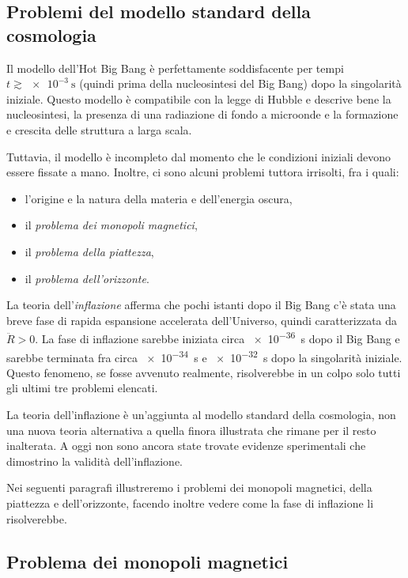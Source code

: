 \subsection{Problemi del modello standard della cosmologia}
\label{sec:problemi-cosmologia}

Il modello dell'Hot Big Bang è perfettamente soddisfacente per tempi \(t\gtrsim
\SI{e-3}{\second}\) (quindi prima della nucleosintesi del Big Bang) dopo la
singolarità iniziale.  Questo modello è compatibile con la legge di Hubble e
descrive bene la nucleosintesi, la presenza di una radiazione di fondo a
microonde e la formazione e crescita delle struttura a larga scala.

Tuttavia, il modello è incompleto dal momento che le condizioni iniziali devono
essere fissate a mano.  Inoltre, ci sono alcuni problemi tuttora irrisolti, fra
i quali:
\begin{itemize}
\item l'origine e la natura della materia e dell'energia oscura,
\item il \emph{problema dei monopoli magnetici},
\item il \emph{problema della piattezza},
\item il \emph{problema dell'orizzonte}.
\end{itemize}
La teoria dell'\emph{inflazione} afferma che pochi istanti dopo il Big Bang c'è
stata una breve fase di rapida espansione accelerata dell'Universo, quindi
caratterizzata da \(\ddot{R}>0\).  La fase di inflazione sarebbe iniziata circa
\SI{e-36}{\second} dopo il Big Bang e sarebbe terminata fra circa
\SI{e-34}{\second} e \SI{e-32}{\second} dopo la singolarità iniziale.  Questo
fenomeno, se fosse avvenuto realmente, risolverebbe in un colpo solo tutti gli
ultimi tre problemi elencati.

La teoria dell'inflazione è un'aggiunta al modello standard della cosmologia,
non una nuova teoria alternativa a quella finora illustrata che rimane per il
resto inalterata.  A oggi non sono ancora state trovate evidenze sperimentali
che dimostrino la validità dell'inflazione.

Nei seguenti paragrafi illustreremo i problemi dei monopoli magnetici, della
piattezza e dell'orizzonte, facendo inoltre vedere come la fase di inflazione li
risolverebbe.

\subsection{Problema dei monopoli magnetici}
\label{sec:problema-monopoli}

